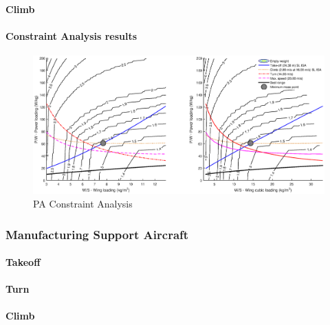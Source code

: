 \paragraph{Climb}

\paragraph{Constraint Analysis results}
\hfill

\begin{figure}[H]
    \centering
    \includegraphics[width=\textwidth]{./preliminary_design/fig/pa_con}
    \caption{PA Constraint Analysis}
    \label{fig:pa_con}
\end{figure}


\subsubsection{Manufacturing Support Aircraft}

\paragraph{Takeoff}

\paragraph{Turn}

\paragraph{Climb}

